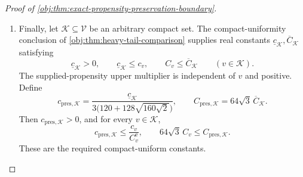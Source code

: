 \begin{proof}[Proof of \cref{obj:thm:exact-propensity-preservation-boundary}]
\begin{enumerate}
\item Finally, let \(\mathcal K\subseteq\mathcal V\) be an arbitrary compact set.
The compact-uniformity conclusion of
\cref{obj:thm:heavy-tail-comparison} supplies real constants
\(\underline c_{\mathcal K},\overline C_{\mathcal K}\) satisfying
\[
\underline c_{\mathcal K}>0,
\qquad
\underline c_{\mathcal K}\le c_v,
\qquad
C_v\le\overline C_{\mathcal K}
\qquad(v\in\mathcal K).
\]
The supplied-propensity upper multiplier is independent of \(v\) and positive. Define
\[
c_{\mathrm{pres},\mathcal K}
=
\frac{\underline c_{\mathcal K}}
{3\bigl(120+128\sqrt{160\sqrt2}\bigr)},
\qquad
C_{\mathrm{pres},\mathcal K}
=
64\sqrt3\,\overline C_{\mathcal K}.
\]
Then \(c_{\mathrm{pres},\mathcal K}>0\), and for every \(v\in\mathcal K\),
\[
c_{\mathrm{pres},\mathcal K}
\le\frac{c_v}{C^{\mathrm e}_v},
\qquad
64\sqrt3\,C_v
\le C_{\mathrm{pres},\mathcal K}.
\]
These are the required compact-uniform constants.
\end{enumerate}
\end{proof}
